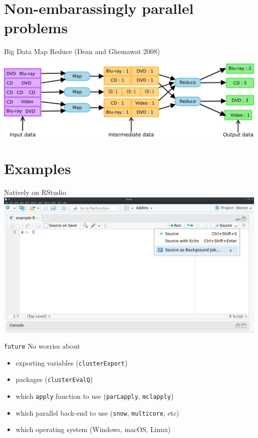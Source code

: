 \documentclass[
  ignorenonframetext,
  usenames,
  dvipsnames]{beamer}
\providecommand{\tightlist}{%
  \setlength{\itemsep}{0pt}\setlength{\parskip}{0pt}}
\begin{document}
\hypertarget{non-embarassingly-parallel-problems}{%
\section{Non-embarassingly parallel
problems}\label{non-embarassingly-parallel-problems}}

\begin{frame}{Big Data}
\protect\hypertarget{big-data-1}{}
Map Reduce (Dean and Ghemawat 2008)

\includegraphics{Map-Reduce.png}
\end{frame}

\hypertarget{examples}{%
\section{Examples}\label{examples}}

\begin{frame}{Natively on RStudio}
\protect\hypertarget{natively-on-rstudio}{}
\includegraphics{source background job.png}
\end{frame}

\begin{frame}[fragile]{\texttt{future}}
\protect\hypertarget{future}{}
No worries about

\begin{itemize}
\tightlist
\item
  exporting variables (\texttt{clusterExport})
\item
  packages (\texttt{clusterEvalQ})
\item
  which \texttt{apply} function to use (\texttt{parLapply},
  \texttt{mclapply})
\item
  which parallel back-end to use (\texttt{snow}, \texttt{multicore},
  etc)
\item
  which operating system (Windows, macOS, Linux)
\end{itemize}
\end{frame}
\end{document}
